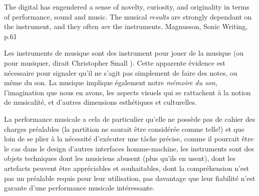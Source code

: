 \cite{small_musicking:_1998}


The digital has engendered a sense of novelty, curiosity, and originality in terms of performance, sound and music. The musical \textit{results} are strongly dependant on the instrument, and they often \textit{are} the instruments. Magnusson, Sonic Writing, p.61

Les instruments de musique sont des instrument pour jouer de la musique (ou pour musiquer, dirait Christopher Small \cite{small_musicking:_1998}). Cette apparente évidence est nécessaire pour signaler qu'il ne s'agit pas simplement de faire des notes, ou même du son. La musique implique également notre \textit{mémoire du son}, l'imagination que nous en avons, les aspects visuels qui se rattachent à la notion de musicalité, et d'autres dimensions esthétiques et culturelles. 

La performance musicale a cela de particulier qu'elle ne possède pas de cahier des charges préalables (la partition ne saurait être considérée comme telle!) et que loin de se plier à la nécessité d'exécuter une tâche précise, comme il pourrait être le cas dans le design d'autres interfaces homme-machine, les instruments sont des objets techniques dont les musiciens abusent (plus qu'ils en usent), dont les artefacts peuvent être appréciables et souhaitables, dont la compréhension n'est pas un préalable requis pour leur utilisation, pas davantage que leur fiabilité n'est garante d'une performance musicale intéressante.

